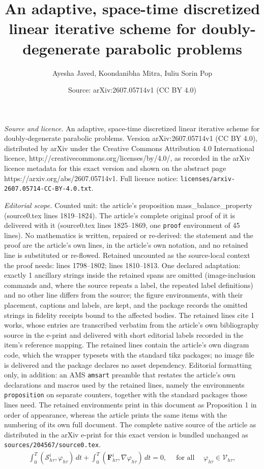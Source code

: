 \documentclass[10pt,a4paper]{amsart}
\title{An adaptive, space-time discretized linear iterative scheme for doubly-degenerate parabolic problems}
\author{Ayesha Javed, Koondanibha Mitra, Iuliu Sorin Pop}
\date{Source: arXiv:2607.05714v1 (CC BY 4.0)}
\def \Fhti {\bm{F}_\htt^i}
\def \Shti {\calS_\htt^i}
\def \calS {\mathcal{S}}
\def \htt {{h\tau}}
\begin{document}
\maketitle

\noindent\emph{Source and licence.} An adaptive, space-time discretized linear iterative scheme for doubly-degenerate parabolic problems. Version arXiv:2607.05714v1 (CC BY 4.0), distributed by arXiv under the Creative Commons Attribution 4.0 International licence, http://creativecommons.org/licenses/by/4.0/, as recorded in the arXiv licence metadata for this exact version and shown on the abstract page https://arxiv.org/abs/2607.05714v1. Full licence notice: \texttt{licenses/arxiv-2607.05714-CC-BY-4.0.txt}.\par\smallskip

\noindent\textit{Editorial scope.} Counted unit: the article's proposition mass\_balance\_property (source0.tex lines 1819--1824). The article's complete original proof of it is delivered with it (source0.tex lines 1825--1869, one \texttt{proof} environment of 45 lines). No mathematics is written, repaired or re-derived: the statement and the proof are the article's own lines, in the article's own notation, and no retained line is substituted or re-flowed.  Retained uncounted as the source-local context the proof needs: lines 1798--1802; lines 1810--1813.  One declared adaptation: exactly 1 ancillary strings inside the retained spans are omitted (image-inclusion commands and, where the source repeats a label, the repeated label definitions) and no other line differs from the source; the figure environments, with their placement, captions and labels, are kept, and the package records the omitted strings in fidelity receipts bound to the affected bodies.  The retained lines cite 1 works, whose entries are transcribed verbatim from the article's own bibliography source in the e-print and delivered with short editorial labels recorded in the item's reference mapping.  The retained lines contain the article's own diagram code, which the wrapper typesets with the standard tikz packages; no image file is delivered and the package declares no asset dependency.  Editorial formatting only, in addition: an AMS \texttt{amsart} preamble that restates the article's own declarations and macros used by the retained lines, namely the environments \texttt{proposition} on separate counters, together with the standard packages those lines need.  The retained environments print in this document as Proposition 1 in order of appearance, whereas the article prints the same items with the numbering of its own full document.  The complete native source of the article as distributed in the arXiv e-print for this exact version is bundled unchanged as \texttt{sources/204567/source0.tex}.
\begin{align}\label{eq:source_flx}
 \int_0^T ( \Shti, \varphi_{h\tau} ) \, dt
 + \int_0^T ( \Fhti, \nabla \varphi_{h\tau} ) \, dt = 0,
 \quad \;\text{for all}\quad\; \varphi_{h\tau} \in \mathcal{V}_{h\tau},
\end{align}
\end{document}
